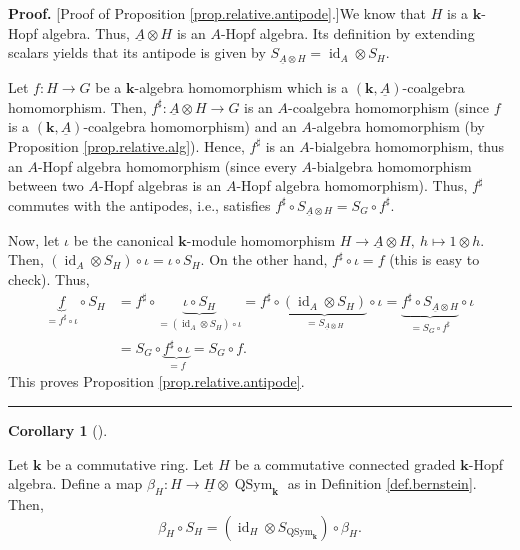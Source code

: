 \documentclass[numbers=enddot,12pt,final,onecolumn,notitlepage,abstracton]{scrartcl}%
\theoremstyle{definition}
\newtheorem{coro}[theo]{Corollary}
\newenvironment{corollary}[1][]
{\begin{coro}[#1]\begin{leftbar}}
{\end{leftbar}\end{coro}}
\newenvironment{proof}[1][Proof]{\noindent\textbf{#1.} }{\ \rule{0.5em}{0.5em}}
\begin{document}
\begin{proof}
[Proof of Proposition \ref{prop.relative.antipode}.]We know that $H$ is a
$\mathbf{k}$-Hopf algebra. Thus, $\underline{A}\otimes H$ is an $A$-Hopf
algebra. Its definition by extending scalars yields that its antipode is given
by $S_{\underline{A}\otimes H}=\operatorname*{id}\nolimits_{A}\otimes S_{H}$.

Let $f:H\rightarrow G$ be a $\mathbf{k}$-algebra homomorphism which is a
$\left(  \mathbf{k},\underline{A}\right)  $-coalgebra homomorphism. Then,
$f^{\sharp}:\underline{A}\otimes H\rightarrow G$ is an $A$-coalgebra
homomorphism (since $f$ is a $\left(  \mathbf{k},\underline{A}\right)
$-coalgebra homomorphism) and an $A$-algebra homomorphism (by Proposition
\ref{prop.relative.alg}). Hence, $f^{\sharp}$ is an $A$-bialgebra
homomorphism, thus an $A$-Hopf algebra homomorphism (since every $A$-bialgebra
homomorphism between two $A$-Hopf algebras is an $A$-Hopf algebra
homomorphism). Thus, $f^{\sharp}$ commutes with the antipodes, i.e., satisfies
$f^{\sharp}\circ S_{\underline{A}\otimes H}=S_{G}\circ f^{\sharp}$.

Now, let $\iota$ be the canonical $\mathbf{k}$-module homomorphism
$H\rightarrow\underline{A}\otimes H,\ h\mapsto1\otimes h$. Then, $\left(
\operatorname*{id}\nolimits_{A}\otimes S_{H}\right)  \circ\iota=\iota\circ
S_{H}$. On the other hand, $f^{\sharp}\circ\iota=f$ (this is easy to check).
Thus,%
\begin{align*}
\underbrace{f}_{=f^{\sharp}\circ\iota}\circ S_{H}  &  =f^{\sharp}%
\circ\underbrace{\iota\circ S_{H}}_{=\left(  \operatorname*{id}\nolimits_{A}%
\otimes S_{H}\right)  \circ\iota}=f^{\sharp}\circ\underbrace{\left(
\operatorname*{id}\nolimits_{A}\otimes S_{H}\right)  }_{=S_{\underline{A}%
\otimes H}}\circ\iota=\underbrace{f^{\sharp}\circ S_{\underline{A}\otimes H}%
}_{=S_{G}\circ f^{\sharp}}\circ\iota\\
&  =S_{G}\circ\underbrace{f^{\sharp}\circ\iota}_{=f}=S_{G}\circ f.
\end{align*}
This proves Proposition \ref{prop.relative.antipode}.
\end{proof}

\begin{corollary}
\label{cor.QSym.bernstein.antipode}Let $\mathbf{k}$ be a commutative ring. Let
$H$ be a commutative connected graded $\mathbf{k}$-Hopf algebra. Define a map
$\beta_{H}:H\rightarrow\underline{H}\otimes\operatorname*{QSym}%
\nolimits_{\mathbf{k}}$ as in Definition \ref{def.bernstein}. Then,%
\[
\beta_{H}\circ S_{H}=\left(  \operatorname*{id}\nolimits_{H}\otimes
S_{\operatorname*{QSym}\nolimits_{\mathbf{k}}}\right)  \circ\beta_{H}.
\]

\end{corollary}
\end{document}
